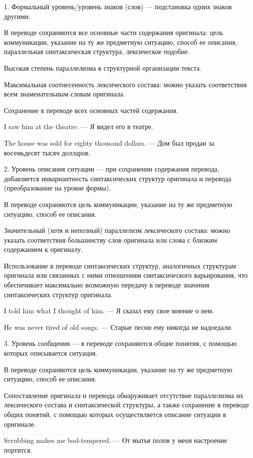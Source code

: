 1. Формальный уровень/уровень знаков (слов) --- подстановка одних знаков другими.

В переводе сохраняются все основные части содержания оригинала: цель коммуникации, указание на ту же предметную ситуацию, способ ее описания, параллельная синтаксическая структура, лексическое подобие.

Высокая степень параллелизма в структурной организации текста.

Максимальная соотнесенность лексического состава: можно указать соответствия всем знаменательным словам оригинала.

Сохранение в переводе всех основных частей содержания.

I saw him at the theatre. --- Я видел его в театре.

The house was sold for eighty thousand dollars. --- Дом был продан за восемьдесят тысяч долларов.

2. Уровень описания ситуации --- при сохранении содержания перевода, добавляется инвариантность синтаксических структур оригинала и перевода (преобразование на уровне формы).

В переводе сохраняются цель коммуникации, указание на ту же предметную ситуацию, способ ее описания.

Значительный (хотя и неполный) параллелизм лексического состава: можно указать соответствия большинству слов оригинала или слова с близким содержанием к оригиналу.

Использование в переводе синтаксических структур, аналогичных структурам оригинала или связанных с ними отношениям синтаксического варьирования, что обеспечивает максимально возможную передачу в переводе значения синтаксических структур оригинала.

I told him what I thought of him. --- Я сказал ему свое мнение о нем. 

He was never tired of old songs. --- Старые песни ему никогда не надоедали. 

3. Уровень сообщения --- в переводе сохраняются общие понятия, с помощью которых описывается ситуация. 

В переводе сохраняются цель коммуникации, указание на ту же предметную ситуацию, способ ее описания.

Сопоставление оригинала и перевода обнаруживает отсутствие параллелизма их лексического состава и синтаксической структуры, а также сохранение в переводе общих понятий, с помощью которых осуществляется описание ситуации в оригинале. 

Scrubbing makes me bad-tempered. --- От мытья полов у меня настроение портится. 

